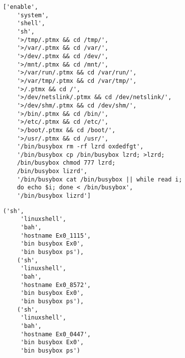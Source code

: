 \begin{lstlisting}[caption={Sample sessions}, label={lst:sessions},captionpos=b]
    ['enable',
    'system',
    'shell',
    'sh',
    '>/tmp/.ptmx && cd /tmp/',
    '>/var/.ptmx && cd /var/',
    '>/dev/.ptmx && cd /dev/',
    '>/mnt/.ptmx && cd /mnt/',
    '>/var/run/.ptmx && cd /var/run/',
    '>/var/tmp/.ptmx && cd /var/tmp/',
    '>/.ptmx && cd /',
    '>/dev/netslink/.ptmx && cd /dev/netslink/',
    '>/dev/shm/.ptmx && cd /dev/shm/',
    '>/bin/.ptmx && cd /bin/',
    '>/etc/.ptmx && cd /etc/',
    '>/boot/.ptmx && cd /boot/',
    '>/usr/.ptmx && cd /usr/',
    '/bin/busybox rm -rf lzrd oxdedfgt',
    '/bin/busybox cp /bin/busybox lzrd; >lzrd; 
    /bin/busybox chmod 777 lzrd; 
    /bin/busybox lizrd',
    '/bin/busybox cat /bin/busybox || while read i; 
    do echo $i; done < /bin/busybox',
    '/bin/busybox lizrd']
\end{lstlisting}

\begin{lstlisting}[caption={Sample cluster sclices}, label={lst:cluster},captionpos=b]
    ('sh',
     'linuxshell',
     'bah',
     'hostname Ex0_1115',
     'bin busybox Ex0',
     'bin busybox ps'),
    ('sh',
     'linuxshell',
     'bah',
     'hostname Ex0_8572',
     'bin busybox Ex0',
     'bin busybox ps'),
    ('sh',
     'linuxshell',
     'bah',
     'hostname Ex0_0447',
     'bin busybox Ex0',
     'bin busybox ps')
\end{lstlisting}
